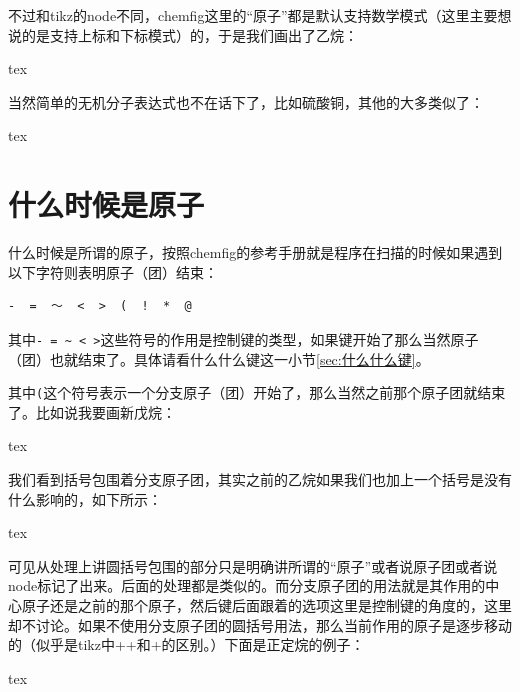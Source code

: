 \documentclass[11pt,oneside]{book}
\begin{document}
不过和tikz的node不同，chemfig这里的“原子”都是默认支持数学模式（这里主要想说的是支持上标和下标模式）的，于是我们画出了乙烷：
\begin{tcbcode}{tex}
\end{tcbcode}


当然简单的无机分子表达式也不在话下了，比如硫酸铜，其他的大多类似了：
\begin{tcbcode}{tex}
\end{tcbcode}


\section{什么时候是原子}
什么时候是所谓的原子，按照chemfig的参考手册就是程序在扫描的时候如果遇到以下字符则表明原子（团）结束：
\begin{Verbatim}
-  =  ～  <  >  (  !  *  @
\end{Verbatim}

其中\verb+- = ~ < >+这些符号的作用是控制键的类型，如果键开始了那么当然原子（团）也就结束了。具体请看什么什么键这一小节\ref{sec:什么什么键}。

其中\verb+(+这个符号表示一个分支原子（团）开始了，那么当然之前那个原子团就结束了。比如说我要画新戊烷：
\begin{tcbcode}{tex}
\end{tcbcode}


我们看到括号包围着分支原子团，其实之前的乙烷如果我们也加上一个括号是没有什么影响的，如下所示：
\begin{tcbcode}{tex}
\end{tcbcode}



可见从处理上讲圆括号包围的部分只是明确讲所谓的“原子”或者说原子团或者说node标记了出来。后面的处理都是类似的。而分支原子团的用法就是其作用的中心原子还是之前的那个原子，然后键后面跟着的选项这里是控制键的角度的，这里却不讨论。如果不使用分支原子团的圆括号用法，那么当前作用的原子是逐步移动的（似乎是tikz中++和+的区别。）下面是正定烷的例子：
\begin{tcbcode}{tex}
\end{tcbcode}
\end{document}
